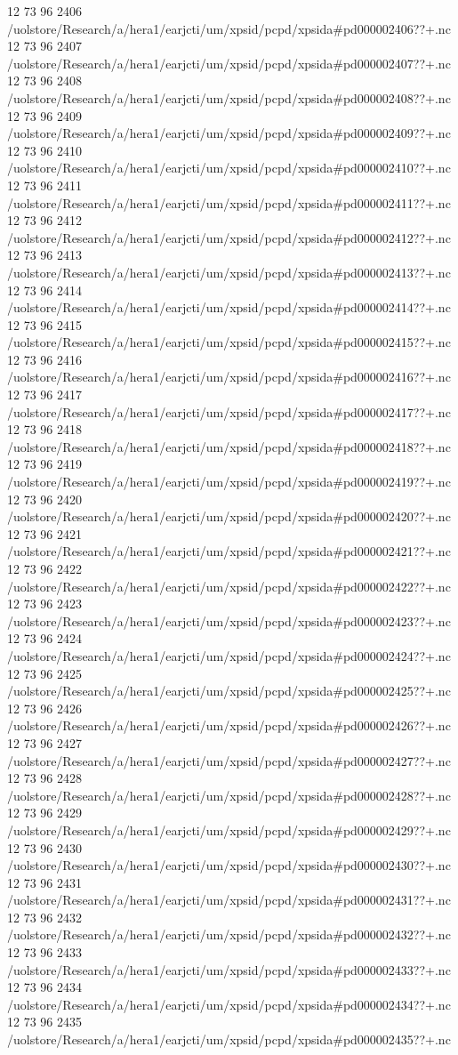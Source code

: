 12 73 96
2406
/uolstore/Research/a/hera1/earjcti/um/xpsid/pcpd/xpsida#pd000002406??+.nc
12 73 96
2407
/uolstore/Research/a/hera1/earjcti/um/xpsid/pcpd/xpsida#pd000002407??+.nc
12 73 96
2408
/uolstore/Research/a/hera1/earjcti/um/xpsid/pcpd/xpsida#pd000002408??+.nc
12 73 96
2409
/uolstore/Research/a/hera1/earjcti/um/xpsid/pcpd/xpsida#pd000002409??+.nc
12 73 96
2410
/uolstore/Research/a/hera1/earjcti/um/xpsid/pcpd/xpsida#pd000002410??+.nc
12 73 96
2411
/uolstore/Research/a/hera1/earjcti/um/xpsid/pcpd/xpsida#pd000002411??+.nc
12 73 96
2412
/uolstore/Research/a/hera1/earjcti/um/xpsid/pcpd/xpsida#pd000002412??+.nc
12 73 96
2413
/uolstore/Research/a/hera1/earjcti/um/xpsid/pcpd/xpsida#pd000002413??+.nc
12 73 96
2414
/uolstore/Research/a/hera1/earjcti/um/xpsid/pcpd/xpsida#pd000002414??+.nc
12 73 96
2415
/uolstore/Research/a/hera1/earjcti/um/xpsid/pcpd/xpsida#pd000002415??+.nc
12 73 96
2416
/uolstore/Research/a/hera1/earjcti/um/xpsid/pcpd/xpsida#pd000002416??+.nc
12 73 96
2417
/uolstore/Research/a/hera1/earjcti/um/xpsid/pcpd/xpsida#pd000002417??+.nc
12 73 96
2418
/uolstore/Research/a/hera1/earjcti/um/xpsid/pcpd/xpsida#pd000002418??+.nc
12 73 96
2419
/uolstore/Research/a/hera1/earjcti/um/xpsid/pcpd/xpsida#pd000002419??+.nc
12 73 96
2420
/uolstore/Research/a/hera1/earjcti/um/xpsid/pcpd/xpsida#pd000002420??+.nc
12 73 96
2421
/uolstore/Research/a/hera1/earjcti/um/xpsid/pcpd/xpsida#pd000002421??+.nc
12 73 96
2422
/uolstore/Research/a/hera1/earjcti/um/xpsid/pcpd/xpsida#pd000002422??+.nc
12 73 96
2423
/uolstore/Research/a/hera1/earjcti/um/xpsid/pcpd/xpsida#pd000002423??+.nc
12 73 96
2424
/uolstore/Research/a/hera1/earjcti/um/xpsid/pcpd/xpsida#pd000002424??+.nc
12 73 96
2425
/uolstore/Research/a/hera1/earjcti/um/xpsid/pcpd/xpsida#pd000002425??+.nc
12 73 96
2426
/uolstore/Research/a/hera1/earjcti/um/xpsid/pcpd/xpsida#pd000002426??+.nc
12 73 96
2427
/uolstore/Research/a/hera1/earjcti/um/xpsid/pcpd/xpsida#pd000002427??+.nc
12 73 96
2428
/uolstore/Research/a/hera1/earjcti/um/xpsid/pcpd/xpsida#pd000002428??+.nc
12 73 96
2429
/uolstore/Research/a/hera1/earjcti/um/xpsid/pcpd/xpsida#pd000002429??+.nc
12 73 96
2430
/uolstore/Research/a/hera1/earjcti/um/xpsid/pcpd/xpsida#pd000002430??+.nc
12 73 96
2431
/uolstore/Research/a/hera1/earjcti/um/xpsid/pcpd/xpsida#pd000002431??+.nc
12 73 96
2432
/uolstore/Research/a/hera1/earjcti/um/xpsid/pcpd/xpsida#pd000002432??+.nc
12 73 96
2433
/uolstore/Research/a/hera1/earjcti/um/xpsid/pcpd/xpsida#pd000002433??+.nc
12 73 96
2434
/uolstore/Research/a/hera1/earjcti/um/xpsid/pcpd/xpsida#pd000002434??+.nc
12 73 96
2435
/uolstore/Research/a/hera1/earjcti/um/xpsid/pcpd/xpsida#pd000002435??+.nc
